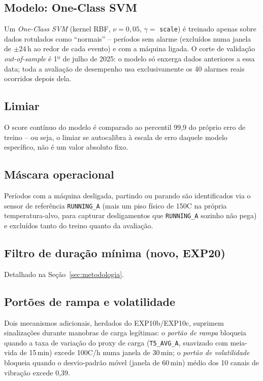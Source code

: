 \documentclass[11pt,a4paper]{article}
\begin{document}
\subsection{Modelo: One-Class SVM}
Um \emph{One-Class SVM} (kernel RBF, $\nu=0{,}05$, $\gamma=$
\texttt{scale}) é treinado apenas sobre dados rotulados como
``normais'' -- períodos sem alarme (excluídos numa janela de
$\pm 24$\,h ao redor de cada evento) e com a máquina ligada. O corte de
validação \emph{out-of-sample} é 1º de julho de 2025: o modelo só
enxerga dados anteriores a essa data; toda a avaliação de desempenho
usa exclusivamente os 40 alarmes reais ocorridos depois dela.

\subsection{Limiar}
O score contínuo do modelo é comparado ao percentil 99,9 do próprio
erro de treino -- ou seja, o limiar se autocalibra à escala de erro
daquele modelo específico, não é um valor absoluto fixo.

\subsection{Máscara operacional}
Períodos com a máquina desligada, partindo ou parando são identificados
via o sensor de referência \texttt{RUNNING\_A} (mais um piso físico de
150\textdegree{}C na própria temperatura-alvo, para capturar
desligamentos que \texttt{RUNNING\_A} sozinho não pega) e excluídos
tanto do treino quanto da avaliação.

\subsection{Filtro de duração mínima (novo, EXP20)}
\label{sec:filtro-duracao}
Detalhado na Seção~\ref{sec:metodologia}.

\subsection{Portões de rampa e volatilidade}
Dois mecanismos adicionais, herdados do EXP10b/EXP10c, suprimem
sinalizações durante manobras de carga legítimas: o \emph{portão de
rampa} bloqueia quando a taxa de variação do proxy de carga
(\texttt{T5\_AVG\_A}, suavizado com meia-vida de 15\,min) excede
100\textdegree{}C/h numa janela de 30\,min; o \emph{portão de
volatilidade} bloqueia quando o desvio-padrão móvel (janela de 60\,min)
médio dos 10 canais de vibração excede 0,39.
\end{document}
